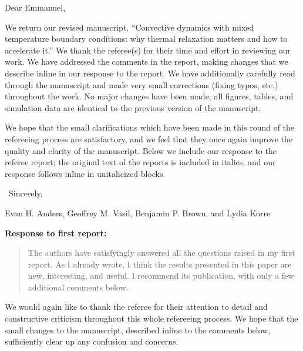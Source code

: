 \documentclass[aps, 11pt, singlecolumn]{revtex4-1} %
\begin{document}
\newenvironment{myquotation}{
\begin{quotation}
\itshape
}{ 
\end{quotation}
}
\noindent
Dear Emmanuel,
$\,$\newline

\begin{singlespace}

We return our revised manuscript, ``Convective dynamics with mixed temperature boundary conditions: why thermal relaxation matters and how to accelerate it.'' 
We thank the referee(s) for their time and effort in reviewing our work.
We have addressed the comments in the report, making changes that we describe inline in our response to the report.
We have additionally carefully read through the manuscript and made very small corrections (fixing typos, etc.) throughout the work.
No major changes have been made; all figures, tables, and simulation data are identical to the previous version of the manuscript.

We hope that the small clarifications which have been made in this round of the refereeing process are satisfactory, and we feel that they once again improve the quality and clarity of the manuscript.
Below we include our response to the referee report; the original text of the reports is included in italics, and our response follows inline in unitalicized blocks.

$\,$\newline
\noindent
Sincerely,

Evan H. Anders, Geoffrey M. Vasil, Benjamin P. Brown, and Lydia Korre



\newpage
\noindent
\Large{\textbf{Response to first report:}}\newline$\,$\newline\indent

\begin{myquotation}
The authors have satisfyingly answered all the questions raised in my first report. 
As I already wrote, I think the results presented in this paper are new, interesting, and useful. 
I recommend its publication, with only a few additional comments below.
\end{myquotation}
We would again like to thank the referee for their attention to detail and constructive criticism throughout this whole refereeing process.
We hope that the small changes to the manuscript, described inline to the comments below, sufficiently clear up any confusion and concerns.


\end{singlespace}
\end{document}
